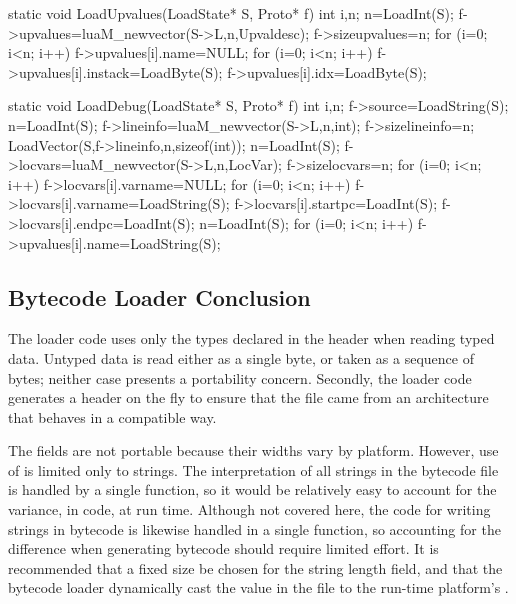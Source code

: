 
\begin{LuaCCode}[caption=Definition of \func{LoadUpvalues} from \filename{lundump.c}]
static void LoadUpvalues(LoadState* S, Proto* f)
{
 int i,n;
 n=LoadInt(S);
 f->upvalues=luaM_newvector(S->L,n,Upvaldesc);
 f->sizeupvalues=n;
 for (i=0; i<n; i++) f->upvalues[i].name=NULL;
 for (i=0; i<n; i++)
 {
  f->upvalues[i].instack=LoadByte(S);
  f->upvalues[i].idx=LoadByte(S);
 }
}
\end{LuaCCode}


\begin{LuaCCode}[caption=Definition of \func{LoadDebug} from \filename{lundump.c}]
static void LoadDebug(LoadState* S, Proto* f)
{
 int i,n;
 f->source=LoadString(S);
 n=LoadInt(S);
 f->lineinfo=luaM_newvector(S->L,n,int);
 f->sizelineinfo=n;
 LoadVector(S,f->lineinfo,n,sizeof(int));
 n=LoadInt(S);
 f->locvars=luaM_newvector(S->L,n,LocVar);
 f->sizelocvars=n;
 for (i=0; i<n; i++) f->locvars[i].varname=NULL;
 for (i=0; i<n; i++)
 {
  f->locvars[i].varname=LoadString(S);
  f->locvars[i].startpc=LoadInt(S);
  f->locvars[i].endpc=LoadInt(S);
 }
 n=LoadInt(S);
 for (i=0; i<n; i++) f->upvalues[i].name=LoadString(S);
}
\end{LuaCCode}


\subsection{Bytecode Loader Conclusion}

	The loader code uses only the types declared in the header when reading
	typed data.  Untyped data is read either as a single byte, or taken as
	a sequence of bytes; neither case presents a portability concern.
	Secondly, the loader code generates a header on the fly to ensure that
	the file came from an architecture that behaves in a compatible way.

	The  fields are not portable because their widths vary
	by platform.  However, use of  is limited only to
	strings.  The interpretation of all strings in the bytecode file is
	handled by a single function, so it would be relatively easy to account
	for the variance, in code, at run time.  Although not covered here, the
	code for writing strings in bytecode is likewise handled in a single
	function, so accounting for the difference when generating bytecode
	should require limited effort.  It is recommended that a fixed size be
	chosen for the string length field, and that the bytecode loader
	dynamically cast the value in the file to the run-time platform's
	.

